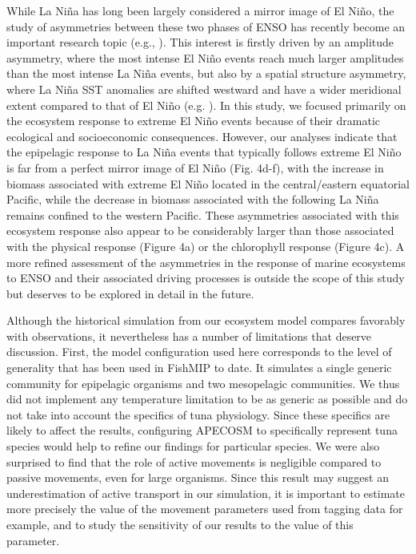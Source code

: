 While La Niña has long been largely considered a mirror image of El Niño, the study of asymmetries between these two phases of ENSO has recently become an important research topic (e.g., \citealt{anENSOIrregularityAsymmetry2020}). This interest is firstly driven by an amplitude asymmetry, where the most intense El Niño events reach much larger amplitudes than the most intense La Niña events, but also by a spatial structure asymmetry, where La Niña SST anomalies are shifted westward and have a wider meridional extent compared to that of El Niño (e.g. \citealt{takahashiENSORegimesReinterpreting2011}). In this study, we focused primarily on the ecosystem response to extreme El Niño events because of their dramatic ecological and socioeconomic consequences. However, our analyses indicate that the epipelagic response to La Niña events that typically follows extreme El Niño is far from a perfect mirror image of El Niño (Fig. 4d-f), with the increase in biomass associated with extreme El Niño located in the central/eastern equatorial Pacific, while the decrease in biomass associated with the following La Niña remains confined to the western Pacific. These asymmetries associated with this ecosystem response also appear to be considerably larger than those associated with the physical response (Figure 4a) or the chlorophyll response (Figure 4c). A more refined assessment of the asymmetries in the response of marine ecosystems to ENSO and their associated driving processes is outside the scope of this study but deserves to be explored in detail in the future.

Although the historical simulation from our ecosystem model compares favorably with observations, it nevertheless has a number of limitations that deserve discussion. First, the model configuration used here corresponds to the level of generality that has been used in FishMIP to date. It simulates a single generic community for epipelagic organisms and two mesopelagic communities. We thus did not implement any temperature limitation to be as generic as possible and do not take into account the specifics of tuna physiology. Since these specifics are likely to affect the results, configuring APECOSM to specifically represent tuna species would help to refine our findings for particular species. We were also surprised to find that the role of active movements is negligible compared to passive movements, even for large organisms. Since this result may suggest an underestimation of active transport in our simulation, it is important to estimate more precisely the value of the movement parameters used from tagging data for example, and to study the sensitivity of our results to the value of this parameter.

